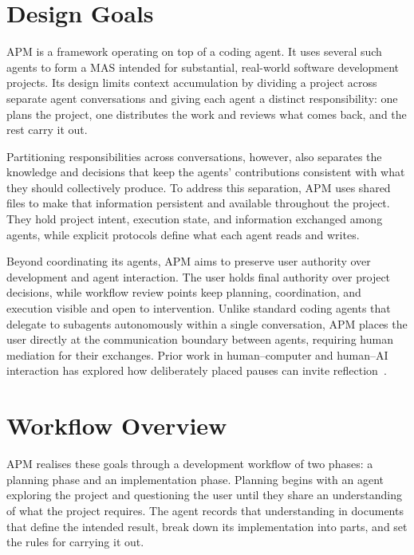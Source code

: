 
\section{Design Goals}
\label{sec:framework-design-goals}

APM is a framework operating on top of a coding agent. It uses several such agents to form a MAS intended for substantial, real-world software development projects. Its design limits context accumulation by dividing a project across separate agent conversations and giving each agent a distinct responsibility: one plans the project, one distributes the work and reviews what comes back, and the rest carry it out.

Partitioning responsibilities across conversations, however, also separates the knowledge and decisions that keep the agents' contributions consistent with what they should collectively produce. To address this separation, APM uses shared files to make that information persistent and available throughout the project. They hold project intent, execution state, and information exchanged among agents, while explicit protocols define what each agent reads and writes.

Beyond coordinating its agents, APM aims to preserve user authority over development and agent interaction. The user holds final authority over project decisions, while workflow review points keep planning, coordination, and execution visible and open to intervention. Unlike standard coding agents that delegate to subagents autonomously within a single conversation, APM places the user directly at the communication boundary between agents, requiring human mediation for their exchanges. Prior work in human–computer and human–AI interaction has explored how deliberately placed pauses can invite reflection~\cite{hallnas2001slowtechnology,chen2024positivefriction}.

\section{Workflow Overview}
\label{sec:framework-design-workflow-overview}

APM realises these goals through a development workflow of two phases: a planning phase and an implementation phase. Planning begins with an agent exploring the project and questioning the user until they share an understanding of what the project requires. The agent records that understanding in documents that define the intended result, break down its implementation into parts, and set the rules for carrying it out.

